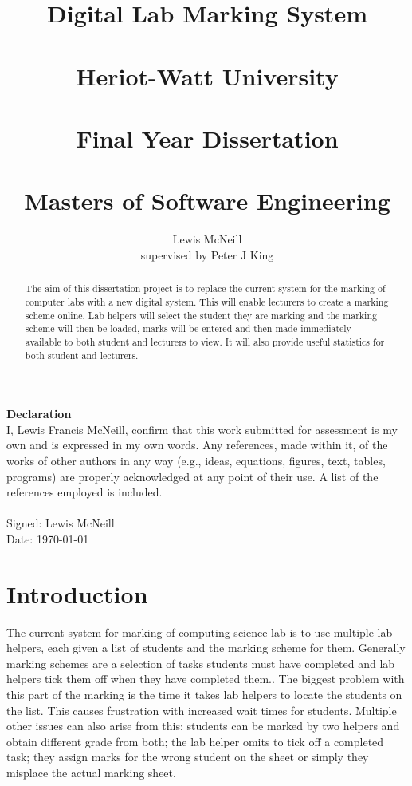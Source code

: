 \documentclass[12pt]{article}  %
\title{Digital Lab Marking System \\~\\  \large{Heriot-Watt University} \\~\\ Final Year Dissertation \\~\\ Masters of Software Engineering}
\author{Lewis McNeill\\
supervised by
Peter J King}
\begin{document}
\maketitle
{}
\newpage

\setcounter{page}{1}

\doublespacing
\textbf{\Large{Declaration}} \\[2em]
I, Lewis Francis McNeill, confirm that this work submitted for assessment is my own and is expressed in my own words. Any references, made within it, of the works of other authors in any way (e.g., ideas, equations, figures, text, tables, programs) are properly acknowledged at any point of their use. A list of the references employed is included.
\\
\\
Signed: Lewis McNeill
\\
Date: \today






\newpage                
\begin{abstract}


\noindent
The aim of this dissertation project is to replace the current system for the marking of computer labs with a new digital system. This will enable lecturers to create a marking scheme online. Lab helpers will select the student they are marking and the marking scheme will then be loaded, marks will be entered and then made immediately available to both student and lecturers to view. It will also provide useful statistics for both student and lecturers.


\end{abstract}


\newpage                 
\tableofcontents




\newpage    


\setcounter{page}{1}


\section{Introduction}


The current system for marking of computing science lab is to use multiple lab helpers, each given a list of students and the marking scheme for them. Generally marking schemes are a selection of tasks students must have completed and lab helpers tick them off when they have completed them.. The biggest problem with this part of the marking is the time it takes lab helpers to locate the students on the list. This causes frustration with increased wait times for students.  Multiple other issues  can also  arise from this: students can be marked by two helpers and obtain different grade from both; the lab helper omits to  tick off a completed task; they assign  marks for the wrong student on the sheet or simply they misplace the actual marking sheet.
\end{document}

